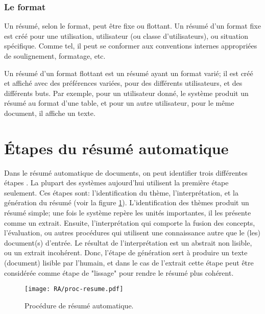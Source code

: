\documentclass[a4paper,12pt,oneside]{../use/ESIthesis}
\begin{document}
\subsubsection{Le format}

Un résumé, selon le format, peut être fixe ou flottant. 
Un résumé d'un format fixe est créé pour une utilisation, utilisateur (ou classe d'utilisateurs), ou situation spécifique. 
Comme tel, il peut se conformer aux conventions internes appropriées de soulignement, formatage, etc.

Un résumé d'un format flottant est un résumé ayant un format varié; il est créé et affiché avec des préférences variées, pour des différents utilisateurs, et des différents buts. 
Par exemple, pour un utilisateur donné, le système produit un résumé au format d'une table, et pour un autre utilisateur, pour le même document, il affiche un texte.

\section{Étapes du résumé automatique}

Dans le résumé automatique de documents, on peut identifier trois différentes étapes \cite{98-hovy-lin, 99-sparckjones}. 
La plupart des systèmes aujourd'hui utilisent la première étape seulement. 
Ces étapes sont: l'identification du thème, l'interprétation, et la génération du résumé (voir la figure \ref{fig:proc-resume}). 
L'identification des thèmes produit un résumé simple; une fois le système repère les unités importantes, il les présente comme un extrait. 
Ensuite, l'interprétation qui comporte la fusion des concepts, l'évaluation, ou autres procédures qui utilisent une connaissance autre que le (les) document(s) d'entrée. 
Le résultat de l'interprétation est un abstrait non lisible, ou un extrait incohérent. 
Donc, l'étape de génération sert à produire un texte (document) lisible par l'humain, et dans le cas de l'extrait cette étape peut être considérée comme étape de "lissage" pour rendre le résumé plus cohérent.

\begin{figure}[ht]
\begin{center}
\texttt{[image: RA/proc-resume.pdf]} %
 \caption{Procédure de résumé automatique.}
 \label{fig:proc-resume}
\end{center}
\end{figure}
\end{document}
